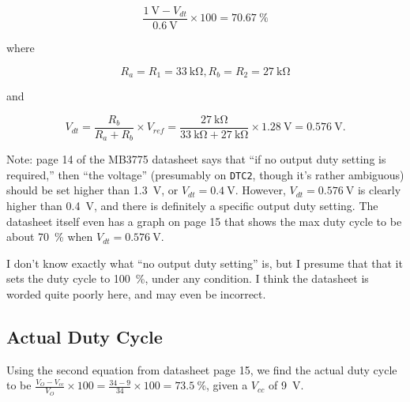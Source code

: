 \documentclass{article}
\newcommand{\Vcc}{$V_{cc}$}
\newcommand{\chippin}{\texttt}
\newcommand{\model}{\textsf}
\begin{document}
\begin{displaymath}
  \frac{\qty{1}{\volt} - V_{dt}}{\qty{0.6}{\volt}} \times{} 100 = \qty{70.67}{\%}
\end{displaymath}

\noindent
where

\begin{displaymath}
  R_a = R_1 = \qty{33}{\kilo\ohm},R_b = R_2 = \qty{27}{\kilo\ohm}
\end{displaymath}

\noindent
and

\begin{displaymath}
  V_{dt} = \frac{R_b}{R_a+R_b} \times{} V_{ref} =
  \frac{\qty{27}{\kilo\ohm}}{\qty{33}{\kilo\ohm} +
    \qty{27}{\kilo\ohm}} \times \qty{1.28}{\volt} = \qty{0.576}{\volt}.
\end{displaymath}

Note: page 14 of the \model{MB3775} datasheet says that ``if no output
duty setting is required,'' then ``the voltage'' (presumably on
\chippin{DTC2}, though it's rather ambiguous) should be set higher
than \qty{1.3}{\volt}, or $V_{dt} = \qty{0.4}{\volt}$. However,
$V_{dt} = \qty{0.576}{\volt}$ is clearly higher than \qty{0.4}{\volt},
and there is definitely a specific output duty setting. The datasheet
itself even has a graph on page 15 that shows the max duty cycle to be
about \qty{70}{\%} when $V_{dt} = \qty{0.576}{\volt}$.

I don't know exactly what ``no output duty setting'' is, but I presume
that that it sets the duty cycle to \qty{100}{\%}, under any
condition. I think the datasheet is worded quite poorly here, and may
even be incorrect.

\subsection{Actual Duty Cycle}
\label{sec:34v_actual_duty_cycle}
Using the second equation from datasheet page 15, we find the actual
duty cycle to be
$\frac{V_O - V_{cc}}{V_O} \times{} 100 = \frac{34 - 9}{34} \times{}
100 = \qty{73.5}{\%}$, given a \Vcc{} of \qty{9}{\volt}.

\end{document}

